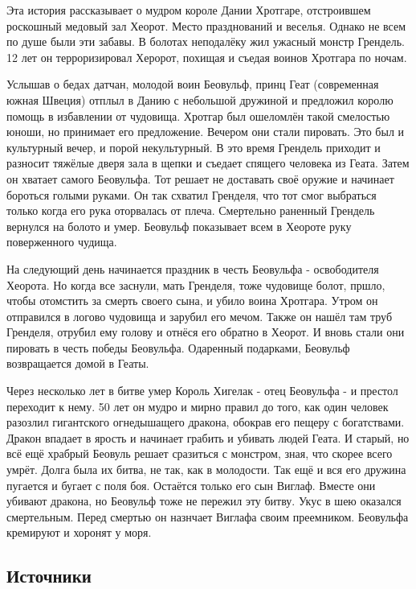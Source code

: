 Эта история рассказывает о мудром короле Дании Хротгаре, отстроившем
роскошный медовый зал Хеорот. Место празднований и веселья. Однако
не всем по душе были эти забавы. В болотах неподалёку жил ужасный
монстр Грендель. 12 лет он терроризировал Херорот, похищая и съедая
воинов Хротгара по ночам.

Услышав о бедах датчан, молодой воин Беовульф, принц Геат
(современная южная Швеция) отплыл в Данию с небольшой дружиной и
предложил королю помощь в избавлении от чудовища. Хротгар был
ошеломлён такой смелостью юноши, но принимает его предложение.
Вечером они стали пировать. Это был и культурный вечер, и порой
некультурный. В это время Грендель приходит и разносит тяжёлые дверя
зала в щепки и съедает спящего человека из Геата. Затем он хватает
самого Беовульфа. Тот решает не доставать своё оружие и начинает
бороться голыми руками. Он так схватил Гренделя, что тот смог
выбраться только когда его рука оторвалась от плеча. Смертельно
раненный Грендель вернулся на болото и умер. Беовульф показывает
всем в Хеороте руку поверженного чудища.

На следующий день начинается праздник в честь Беовульфа -
освободителя Хеорота. Но когда все заснули, мать Гренделя, тоже
чудовище болот, пршло, чтобы отомстить за смерть своего сына, и
убило воина Хротгара. Утром он отправился в логово чудовища и
зарубил его мечом. Также он нашёл там труб Гренделя, отрубил ему
голову и отнёся его обратно в Хеорот. И вновь стали они пировать в
честь победы Беовульфа. Одаренный подарками, Беовульф возвращается
домой в Геаты.

Через несколько лет в битве умер Король Хигелак - отец Беовульфа - и
престол переходит к нему. 50 лет он мудро и мирно правил до того,
как один человек разозлил гигантского огнедышащего дракона, обокрав
его пещеру с богатствами. Дракон впадает в ярость и начинает грабить
и убивать людей Геата. И старый, но всё ещё храбрый Беовуль решает
сразиться с монстром, зная, что скорее всего умрёт. Долга была их
битва, не так, как в молодости. Так ещё и вся его дружина пугается и
бугает с поля боя. Остаётся только его сын Виглаф. Вместе они
убивают дракона, но Беовульф тоже не пережил эту битву. Укус в шею
оказался смертельным. Перед смертью он назнчает Виглафа своим
преемником. Беовульфа кремируют и хоронят у моря.

\subsection*{Источники}

